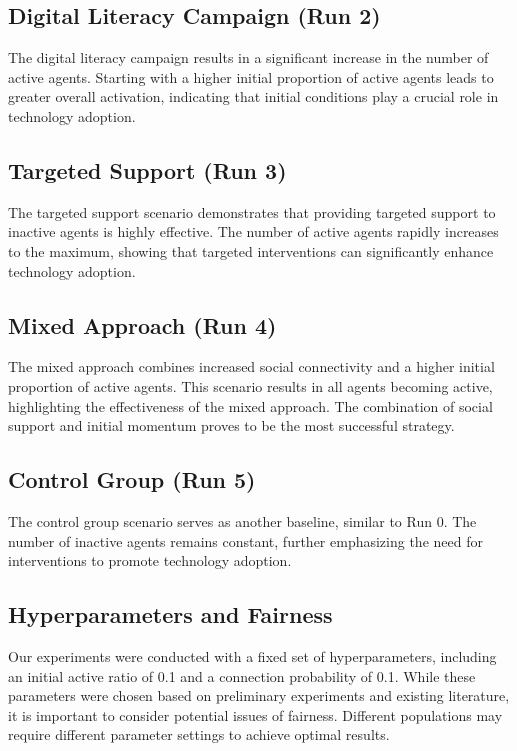\documentclass{article} %
\begin{document}
\subsection{Digital Literacy Campaign (Run 2)}
The digital literacy campaign results in a significant increase in the number of active agents. Starting with a higher initial proportion of active agents leads to greater overall activation, indicating that initial conditions play a crucial role in technology adoption.


\subsection{Targeted Support (Run 3)}
The targeted support scenario demonstrates that providing targeted support to inactive agents is highly effective. The number of active agents rapidly increases to the maximum, showing that targeted interventions can significantly enhance technology adoption.


\subsection{Mixed Approach (Run 4)}
The mixed approach combines increased social connectivity and a higher initial proportion of active agents. This scenario results in all agents becoming active, highlighting the effectiveness of the mixed approach. The combination of social support and initial momentum proves to be the most successful strategy.


\subsection{Control Group (Run 5)}
The control group scenario serves as another baseline, similar to Run 0. The number of inactive agents remains constant, further emphasizing the need for interventions to promote technology adoption.


\subsection{Hyperparameters and Fairness}
Our experiments were conducted with a fixed set of hyperparameters, including an initial active ratio of 0.1 and a connection probability of 0.1. While these parameters were chosen based on preliminary experiments and existing literature, it is important to consider potential issues of fairness. Different populations may require different parameter settings to achieve optimal results.
\end{document}
